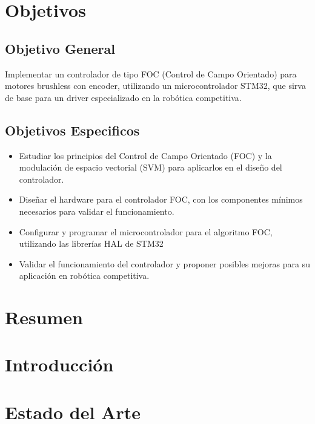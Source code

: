 \documentclass[11pt]{report}
\begin{document}
\normalsize
{}
\setcounter{page}{3}

\newpage
\tableofcontents




\newpage
\chapter*{Objetivos}
\section*{Objetivo General}
Implementar un controlador de tipo FOC (Control de Campo Orientado) para motores brushless con encoder, utilizando un microcontrolador STM32, que sirva de base para un driver especializado en la robótica competitiva.

\section*{Objetivos Especificos}
\begin{itemize}
    \item Estudiar los principios del Control de Campo Orientado (FOC) y la modulación de espacio vectorial (SVM) para aplicarlos en el diseño del controlador.
    \item Diseñar el hardware para el controlador FOC, con los componentes mínimos necesarios para validar el funcionamiento.
    \item Configurar y programar el microcontrolador para el algoritmo FOC, utilizando las librerías HAL de STM32
    \item Validar el funcionamiento del controlador y proponer posibles mejoras para su aplicación en robótica competitiva.
\end{itemize}

\newpage
\chapter*{Resumen}

\newpage
\chapter*{Introducción}

\newpage
\chapter{Estado del Arte}
\end{document}
